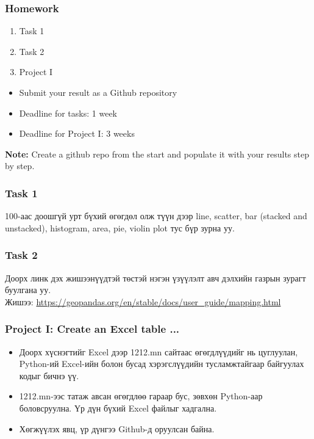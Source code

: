 \documentclass{beamer}
\begin{document}
\begin{frame}
    \frametitle{Homework}
    \begin{enumerate}
        \item Task 1
        \item Task 2
        \item Project I
    \end{enumerate}

    \vskip 2mm
    \begin{itemize}
        \item Submit your result as a Github repository
        \item Deadline for tasks: 1 week %
        \item Deadline for Project I: 3 weeks %
    \end{itemize}

\vfill
\textbf{Note:} Create a github repo from the start and populate it with your results step by step.

\end{frame}

\begin{frame}
    \frametitle{Task 1}
    100-аас доошгүй урт бүхий өгөгдөл олж түүн дээр 
    line, scatter, bar (stacked and unstacked), histogram,
    area, pie, violin plot тус бүр зурна уу.
\end{frame}

\begin{frame}
    \frametitle{Task 2}
    Доорх линк дэх жишээнүүдтэй төстэй нэгэн үзүүлэлт
    авч дэлхийн газрын зурагт буулгана уу. \\
    Жишээ:
	\url{https://geopandas.org/en/stable/docs/user_guide/mapping.html}
\end{frame}

\begin{frame}
    \frametitle{Project I: Create an Excel table ...}
    \begin{itemize}
        \item Доорх хүснэгтийг Excel дээр 1212.mn сайтаас өгөгдлүүдийг нь цуглуулан, 
        Python-ий Excel-ийн болон бусад хэрэгслүүдийн тусламжтайгаар 
        байгуулах кодыг бичнэ үү. 
        \item 1212.mn-ээс татаж авсан өгөгдлөө гараар бус, зөвхөн Python-аар
        боловсруулна. Үр дүн бүхий Excel файлыг хадгална.
        \item Хөгжүүлэх явц, үр дүнгээ Github-д оруулсан байна.        
    \end{itemize}

\end{frame}
\end{document}
